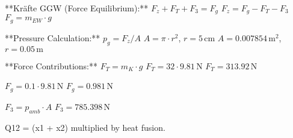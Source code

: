 **Kräfte GGW (Force Equilibrium):**  
\( F_z + F_T + F_3 = F_g \)  
\( F_z = F_g - F_T - F_3 \)  
\( F_g = m_{EW} \cdot g \)  

**Pressure Calculation:**  
\( p_g = F_z / A \)  
\( A = \pi \cdot r^2 \), \( r = 5 \, \text{cm} \)  
\( A = 0.007854 \, \text{m}^2 \), \( r = 0.05 \, \text{m} \)  

**Force Contributions:**  
\( F_T = m_K \cdot g \)  
\( F_T = 32 \cdot 9.81 \, \text{N} \)  
\( F_T = 313.92 \, \text{N} \)  

\( F_g = 0.1 \cdot 9.81 \, \text{N} \)  
\( F_g = 0.981 \, \text{N} \)  

\( F_3 = p_{amb} \cdot A \)  
\( F_3 = 785.398 \, \text{N} \)

Q12 = (x1 + x2) multiplied by heat fusion.